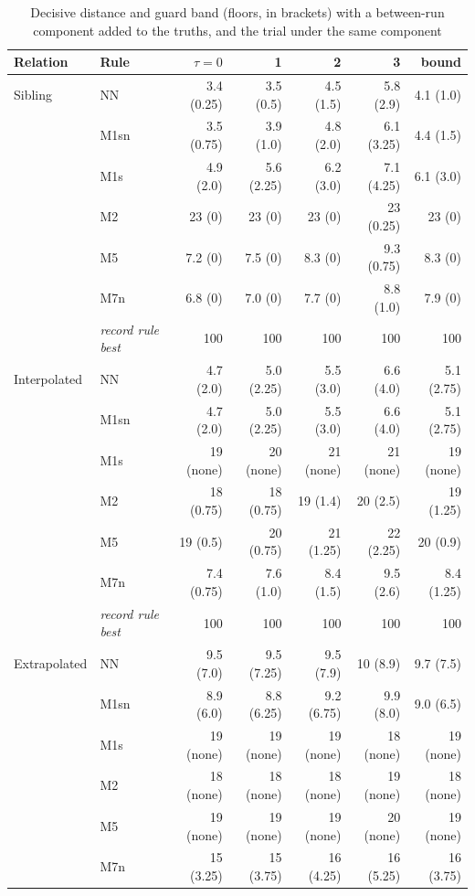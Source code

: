 \documentclass[pdflatex,sn-basic]{sn-jnl}
\newcommand{\tabsizesmall}{\footnotesize}
\begin{document}
\begin{table}[p]
\tabsizesmall
\setlength{\tabcolsep}{4pt}
\caption{Decisive distance and guard band (floors, in brackets) with a between-run component added to the truths, and the trial under the same component}\label{tab:s-between}
\begin{tabular}{@{}llrrrrr@{}}
\toprule
Relation & Rule & $\tau=0$ & 1 & 2 & 3 & bound \\
\midrule
Sibling & NN & 3.4 (0.25) & 3.5 (0.5) & 4.5 (1.5) & 5.8 (2.9) & 4.1 (1.0) \\
 & M1sn & 3.5 (0.75) & 3.9 (1.0) & 4.8 (2.0) & 6.1 (3.25) & 4.4 (1.5) \\
 & M1s & 4.9 (2.0) & 5.6 (2.25) & 6.2 (3.0) & 7.1 (4.25) & 6.1 (3.0) \\
 & M2 & 23 (0) & 23 (0) & 23 (0) & 23 (0.25) & 23 (0) \\
 & M5 & 7.2 (0) & 7.5 (0) & 8.3 (0) & 9.3 (0.75) & 8.3 (0) \\
 & M7n & 6.8 (0) & 7.0 (0) & 7.7 (0) & 8.8 (1.0) & 7.9 (0) \\
& \emph{record rule best} & 100 & 100 & 100 & 100 & 100 \\
Interpolated & NN & 4.7 (2.0) & 5.0 (2.25) & 5.5 (3.0) & 6.6 (4.0) & 5.1 (2.75) \\
 & M1sn & 4.7 (2.0) & 5.0 (2.25) & 5.5 (3.0) & 6.6 (4.0) & 5.1 (2.75) \\
 & M1s & 19 (none) & 20 (none) & 21 (none) & 21 (none) & 19 (none) \\
 & M2 & 18 (0.75) & 18 (0.75) & 19 (1.4) & 20 (2.5) & 19 (1.25) \\
 & M5 & 19 (0.5) & 20 (0.75) & 21 (1.25) & 22 (2.25) & 20 (0.9) \\
 & M7n & 7.4 (0.75) & 7.6 (1.0) & 8.4 (1.5) & 9.5 (2.6) & 8.4 (1.25) \\
& \emph{record rule best} & 100 & 100 & 100 & 100 & 100 \\
Extrapolated & NN & 9.5 (7.0) & 9.5 (7.25) & 9.5 (7.9) & 10 (8.9) & 9.7 (7.5) \\
 & M1sn & 8.9 (6.0) & 8.8 (6.25) & 9.2 (6.75) & 9.9 (8.0) & 9.0 (6.5) \\
 & M1s & 19 (none) & 19 (none) & 19 (none) & 18 (none) & 19 (none) \\
 & M2 & 18 (none) & 18 (none) & 18 (none) & 19 (none) & 18 (none) \\
 & M5 & 19 (none) & 19 (none) & 19 (none) & 20 (none) & 19 (none) \\
 & M7n & 15 (3.25) & 15 (3.75) & 16 (4.25) & 16 (5.25) & 16 (3.75) \\

\end{tabular}
\end{table}
\end{document}
